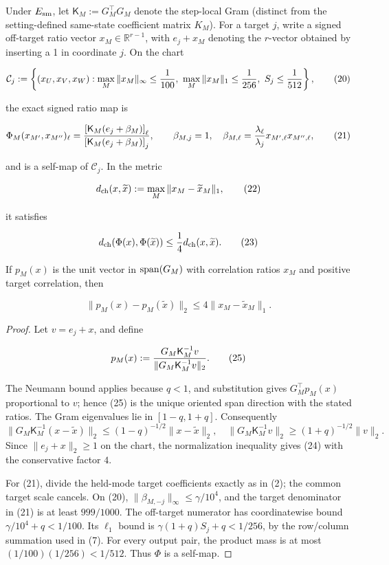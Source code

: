 \begin{lemma}\label{lem:step-004-chart}
Under \(E_{\rm sm}\), let
\(\mathsf K_M:=G_M^\top G_M\) denote the step-local Gram (distinct from the
setting-defined same-state coefficient matrix \(K_M\)).
For a target \(j\), write a signed off-target ratio vector
\(x_M\in\mathbb R^{r-1}\), with \(e_j+x_M\) denoting the \(r\)-vector obtained by inserting a
1 in coordinate \(j\). On the chart

\[
\mathcal C_j:=\left\{(x_U,x_V,x_W):
\max_M\|x_M\|_\infty\le {1\over100},\
\max_M\|x_M\|_1\le {1\over256},\
S_j\le {1\over512}\right\},
\tag{20}
\]

the exact signed ratio map is

\[
\Phi_M(x_{M'},x_{M''})_\ell
={\left[\mathsf K_M(e_j+\beta_M)\right]_\ell\over
\left[\mathsf K_M(e_j+\beta_M)\right]_j},\qquad
\beta_{M,j}=1,\quad
\beta_{M,\ell}={\lambda_\ell\over\lambda_j}
x_{M',\ell}x_{M'',\ell},
\tag{21}
\]

and is a self-map of \(\mathcal C_j\). In the metric

\[
d_{\rm ch}(x,\widetilde x):=\max_M\|x_M-\widetilde x_M\|_1,
\tag{22}
\]

it satisfies

\[
d_{\rm ch}(\Phi(x),\Phi(\widetilde x))\le {1\over4}
d_{\rm ch}(x,\widetilde x).
\tag{23}
\]

If \(p_M(x)\) is the unit vector in \({\rm span}(G_M)\) with correlation
ratios \(x_M\) and positive target correlation, then

\[
\|p_M(x)-p_M(\widetilde x)\|_2\le4\|x_M-\widetilde x_M\|_1.
\tag{24}
\]

\begin{proof}
Let \(v=e_j+x\), and define

\[
p_M(x):={G_M\mathsf K_M^{-1}v\over
\|G_M\mathsf K_M^{-1}v\|_2}.
\tag{25}
\]

The Neumann bound applies because \(q<1\), and substitution gives
\(G_M^\top p_M(x)\) proportional to \(v\); hence (25) is the unique oriented
span direction with the stated ratios. The Gram eigenvalues lie in
\([1-q,1+q]\). Consequently
\[
\|G_M\mathsf K_M^{-1}(x-\widetilde x)\|_2
\le(1-q)^{-1/2}\|x-\widetilde x\|_2,
\quad
\|G_M\mathsf K_M^{-1}v\|_2\ge(1+q)^{-1/2}\|v\|_2.
\]
Since \(\|e_j+x\|_2\ge1\) on the chart, the normalization inequality gives
(24) with the conservative factor \(4\).

For (21), divide the held-mode target coefficients exactly as in (2); the
common target scale cancels. On (20),
\(\|\beta_{M,-j}\|_\infty\le\gamma/10^4\), and the target denominator in
(21) is at least \(999/1000\). The off-target numerator has coordinatewise
bound \(\gamma/10^4+q<1/100\). Its \(\ell_1\) bound is
\(\gamma(1+q)S_j+q<1/256\), by the row/column summation used in (7).
For every output pair, the product mass is at most
\((1/100)(1/256)<1/512\). Thus \(\Phi\) is a self-map.


\end{proof}
\end{lemma}
